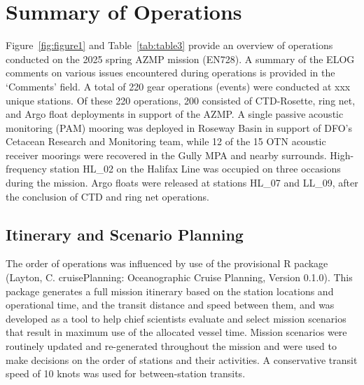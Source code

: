 \documentclass[12pt]{article}\usepackage[]{graphicx}\usepackage[]{color}
\begin{document}
\pagestyle{plain}

\section{Summary of Operations}\label{ops-summary}

\pagestyle{plain}

Figure~\ref{fig:figure1} and Table~\ref{tab:table3} provide an overview of operations conducted on the 2025 spring AZMP mission (EN728). A summary of the ELOG comments on various issues encountered during operations is provided in the `Comments' field. A total of 220 gear operations (events) were conducted at xxx unique stations. Of these 220 operations, 200 consisted of CTD-Rosette, ring net, and Argo float deployments in support of the AZMP. A single passive acoustic monitoring (PAM) mooring was deployed in Roseway Basin in support of DFO's Cetacean Research and Monitoring team, while 12 of the 15 OTN acoustic receiver moorings were recovered in the Gully MPA and nearby surrounds. High-frequency station HL\_02 on the Halifax Line was occupied on three occasions during the mission. Argo floats were released at stations HL\_07 and LL\_09, after the conclusion of CTD and ring net operations.

\subsection{Itinerary and Scenario Planning}\label{itinerary-and-scenario-planning}

The order of operations was influenced by use of the provisional  R package (Layton, C. cruisePlanning: Oceanographic Cruise Planning, Version 0.1.0). This package generates a full mission itinerary based on the station locations and operational time, and the transit distance and speed between them, and was developed as a tool to help chief scientists evaluate and select mission scenarios that result in maximum use of the allocated vessel time. Mission scenarios were routinely updated and re-generated throughout the mission and were used to make decisions on the order of stations and their activities. A conservative transit speed of 10 knots was used for between-station transits.

\clearpage
\end{document}
